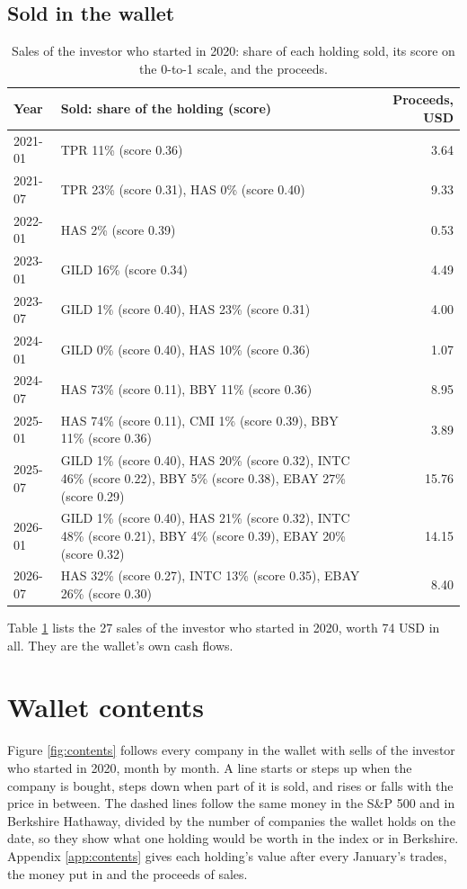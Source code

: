 \documentclass[11pt,a4paper]{article}
\begin{document}
\subsection{Sold in the wallet}
\begin{table}[H]
\centering
\small
\caption{Sales of the investor who started in 2020: share of each holding sold, its score on the 0-to-1 scale, and the proceeds.}\label{tab:sales}
\begin{tabular}{l p{11cm} r}
\hline
Year & Sold: share of the holding (score) & Proceeds, USD \\
\hline
2021-01 & TPR 11\% (score 0.36) & 3.64 \\
2021-07 & TPR 23\% (score 0.31), HAS 0\% (score 0.40) & 9.33 \\
2022-01 & HAS 2\% (score 0.39) & 0.53 \\
2023-01 & GILD 16\% (score 0.34) & 4.49 \\
2023-07 & GILD 1\% (score 0.40), HAS 23\% (score 0.31) & 4.00 \\
2024-01 & GILD 0\% (score 0.40), HAS 10\% (score 0.36) & 1.07 \\
2024-07 & HAS 73\% (score 0.11), BBY 11\% (score 0.36) & 8.95 \\
2025-01 & HAS 74\% (score 0.11), CMI 1\% (score 0.39), BBY 11\% (score 0.36) & 3.89 \\
2025-07 & GILD 1\% (score 0.40), HAS 20\% (score 0.32), INTC 46\% (score 0.22), BBY 5\% (score 0.38), EBAY 27\% (score 0.29) & 15.76 \\
2026-01 & GILD 1\% (score 0.40), HAS 21\% (score 0.32), INTC 48\% (score 0.21), BBY 4\% (score 0.39), EBAY 20\% (score 0.32) & 14.15 \\
2026-07 & HAS 32\% (score 0.27), INTC 13\% (score 0.35), EBAY 26\% (score 0.30) & 8.40 \\
\hline
\end{tabular}
\end{table}
Table \ref{tab:sales} lists the 27 sales of the investor who started in 2020, worth 74 USD in all. They are the wallet's own cash flows.

\section{Wallet contents}
Figure \ref{fig:contents} follows every company in the wallet with sells of the investor who started in 2020, month by month. A line starts or steps up when the company is bought, steps down when part of it is sold, and rises or falls with the price in between. The dashed lines follow the same money in the S\&P 500 and in Berkshire Hathaway, divided by the number of companies the wallet holds on the date, so they show what one holding would be worth in the index or in Berkshire. Appendix \ref{app:contents} gives each holding's value after every January's trades, the money put in and the proceeds of sales.
\end{document}
